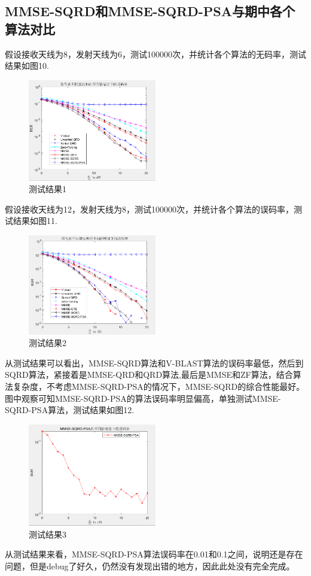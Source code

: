 \documentclass[a4paper,12pt]{article}
\begin{document}
	\subsection{MMSE-SQRD和MMSE-SQRD-PSA与期中各个算法对比}
	假设接收天线为8，发射天线为6，测试100000次，并统计各个算法的无码率，测试结果如图10.\par 
	\begin{figure}[h]
		\centering
		\includegraphics[width=0.5\textwidth]{12.png}
		\caption{测试结果1}
	\end{figure}
	假设接收天线为12，发射天线为8，测试100000次，并统计各个算法的误码率，测试结果如图11.\par 
	\begin{figure}[h]
		\centering
		\includegraphics[width=0.5\textwidth]{13.png}
		\caption{测试结果2}
	\end{figure}
	\newpage
	从测试结果可以看出，MMSE-SQRD算法和V-BLAST算法的误码率最低，然后到SQRD算法，紧接着是MMSE-QRD和QRD算法,最后是MMSE和ZF算法，结合算法复杂度，不考虑MMSE-SQRD-PSA的情况下，MMSE-SQRD的综合性能最好。图中观察可知MMSE-SQRD-PSA的算法误码率明显偏高，单独测试MMSE-SQRD-PSA算法，测试结果如图12.\par 
	\newpage
	\begin{figure}[h]
		\centering
		\includegraphics[width=0.5\textwidth]{14.png}
		\caption{测试结果3}
	\end{figure}
	从测试结果来看，MMSE-SQRD-PSA算法误码率在0.01和0.1之间，说明还是存在问题，但是debug了好久，仍然没有发现出错的地方，因此此处没有完全完成。
\end{document}
